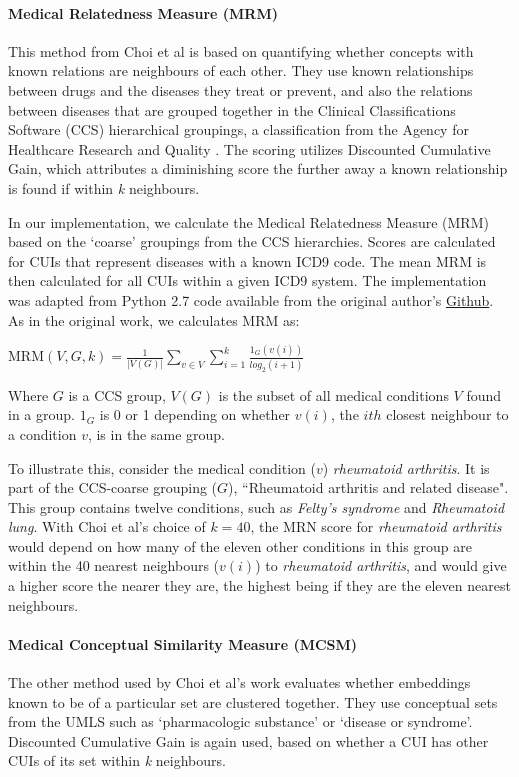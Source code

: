 \documentclass[11pt,a4paper]{article}
\begin{document}
\paragraph{Medical Relatedness Measure (MRM)}

This method from Choi et al  is based on quantifying whether concepts with known relations are neighbours of each other.  They use known relationships between drugs and the diseases they treat or prevent, and also the relations between diseases that are grouped together in the Clinical Classifications Software (CCS) hierarchical groupings, a classification from the Agency for Healthcare Research and Quality \cite{ClinicalClassificationsSoftware}. The scoring utilizes Discounted Cumulative Gain, which attributes a diminishing score the further away a known relationship is found if within \emph{k} neighbours. 

In our implementation, we calculate the Medical Relatedness Measure (MRM) based on the `coarse' groupings from the CCS hierarchies. Scores are calculated for CUIs that represent diseases with a known ICD9 code. The mean MRM is then calculated for all CUIs within a given ICD9 system. The implementation was adapted from Python 2.7 code available from the original author's \href{https://github.com/clinicalml/embeddings}{Github}. As in the original work, we calculates MRM as:

MRM$(V,G,k) = \frac{1}{|V(G)|}\sum\limits_{v\in V}\sum\limits_{i=1}^k \frac{1_G(v(i))}{log_2(i+1)}$

Where $G$ is a CCS group, $V(G)$ is the subset of all medical conditions $V$ found in a group. $1_G$ is 0 or 1 depending on whether $v(i)$, the $ith$ closest neighbour to a condition $v$, is in the same group.  

To illustrate this, consider the medical condition ($v$) \emph{rheumatoid arthritis}. It is part of the CCS-coarse grouping ($G$), ``Rheumatoid arthritis and related disease". This group contains twelve conditions, such as \emph{Felty's syndrome} and \emph{Rheumatoid lung}. With Choi et al's choice of $k=40$, the MRN score for \emph{rheumatoid arthritis} would depend on how many of the eleven other conditions in this group are within the 40 nearest neighbours ($v(i)$) to \emph{rheumatoid arthritis}, and would give a higher score the nearer they are, the highest being if they are the eleven nearest neighbours. 

\paragraph{Medical Conceptual Similarity Measure (MCSM)} The other method used by Choi et al's work evaluates whether embeddings known to be of a particular set are clustered together. They use conceptual sets from the UMLS such as `pharmacologic substance' or `disease or syndrome'.  Discounted Cumulative Gain is again used, based on whether a CUI has other CUIs of its set within \emph{k} neighbours. 
\end{document}
